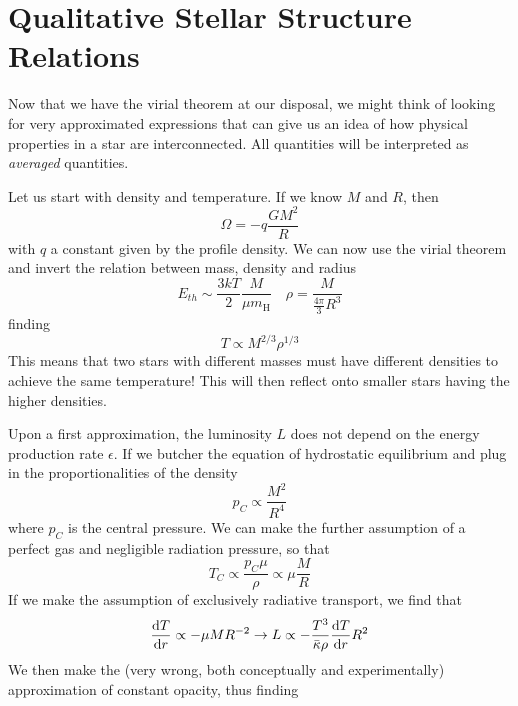 \section{Qualitative Stellar Structure Relations}

Now that we have the virial theorem at our disposal, we might think of looking for very approximated expressions that can give us an idea of how physical properties in a star are interconnected. All quantities will be interpreted as \emph{averaged} quantities.
\par Let us start with density and temperature. If we know $M$ and $R$, then
\begin{equation*}
	\Omega = -q\frac{GM^{2}}{R}
\end{equation*}
with $q$ a constant given by the profile density. We can now use the virial theorem and invert the relation between mass, density and radius
\begin{equation*}
	E_{th} \sim \frac{3kT}{2}\frac{M}{\mu m_{\text{H}}} \quad \rho = \frac{M}{\frac{4\pi}{3}R^{3}}
\end{equation*}
finding 
\begin{equation}
	\boxed{
		T \propto M^{2/3}\rho^{1/3}
	}
	\label{eq:temperature_density}
\end{equation}
This means that two stars with different masses must have different densities to achieve the same temperature! This will then reflect onto smaller stars having the higher densities.
\par Upon a first approximation, the luminosity $L$ does not depend on the energy production rate $\epsilon$. If we butcher the equation of hydrostatic equilibrium and plug in the proportionalities of the density
\begin{equation*}
	p_{C} \propto \frac{M^{2}}{R^{4}}
\end{equation*}
where $p_{C}$ is the central pressure. We can make the further assumption of a perfect gas and negligible radiation pressure, so that
\begin{equation}
	\boxed{
	T_{C} \propto \frac{p_{C}\mu}{\rho} \propto \mu \frac{M}{R}
	}
	\label{eq:temperature_massradius}
\end{equation}
If we make the assumption of exclusively radiative transport, we find that 
\begin{equation*}
	\frac{\text{d}T}{\text{d}r} \propto -\mu M R^{-2} \to L \propto -\frac{T^{3}}{\bar{\kappa}\rho}\frac{\text{d}T}{\text{d}r}R^{2}
\end{equation*}
We then make the (very wrong, both conceptually and experimentally) approximation of constant opacity, thus finding
